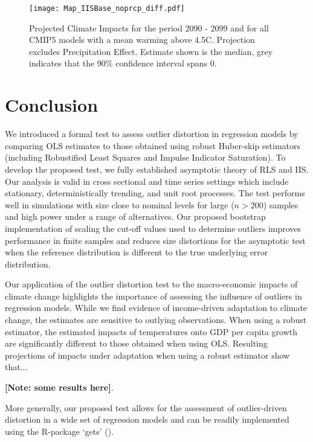 \documentclass[11pt, letterpaper]{article}
\numberwithin{algorithm}{section}
\numberwithin{assumption}{section}
\numberwithin{lemma}{section}
\numberwithin{theorem}{section}
\numberwithin{corollary}{section}
\numberwithin{remark}{section}
\numberwithin{equation}{section}
\numberwithin{figure}{section}
\numberwithin{table}{section}
\begin{document}
\begin{figure}[!htbp]  \vspace{-.35in}
\centering
\texttt{[image: Map\_IISBase\_noprcp\_diff.pdf]}
\caption{Projected Climate Impacts for the period 2090 - 2099 and for all CMIP5 models with a mean warming above 4.5\textdegree C. Projection excludes Precipitation Effect. Estimate shown is the median, grey indicates that the 90\% confidence interval spans 0.}
\label{fig_projection_map}
\end{figure}


\clearpage
\section{Conclusion}
We introduced a formal test to assess outlier distortion in regression models by comparing OLS estimates to those obtained using robust Huber-skip estimators (including Robustified Least Squares and Impulse Indicator Saturation). To develop the proposed test, we fully established asymptotic theory of RLS and IIS. Our analysis is valid in cross sectional and time series settings which include stationary, deterministically trending, and unit root processes. The test performs well in simulations with size close to nominal levels for large ($n>200$) samples and high power under a range of alternatives. Our proposed bootstrap implementation of scaling the cut-off values used to determine outliers improves performance in finite samples and reduces size distortions for the asymptotic test when the reference distribution is different to the true underlying error distribution.

Our application of the outlier distortion test to the macro-economic impacts of climate change highlights the importance of assessing the influence of outliers in regression models. While we find evidence of income-driven adaptation to climate change, the estimates are sensitive to outlying observations.
When using a robust estimator, the estimated impacts of temperatures onto GDP per capita growth are significantly different to those obtained when using OLS. Resulting projections of impacts under adaptation when using a robust estimator show that...

\textbf{[Note: some results here]}.

More generally, our proposed test allows for the assessment of outlier-driven distortion in a wide set of regression models and can be readily implemented using the R-package `gets' (\citealt{pretis2018automated}).
\end{document}

